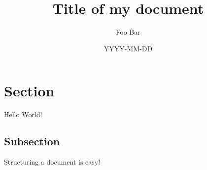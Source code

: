 \documentclass{article}
\title{Title of my document}
\date{YYYY-MM-DD}
\author{Foo Bar}
\begin{document}
\maketitle
\tableofcontents
{}
\newpage
{}

\section{Section}

Hello World!

\subsection{Subsection}

Structuring a document is easy!
\end{document}
